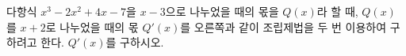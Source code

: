 \noindent\begin{minipage}[t]{0.58\linewidth}\vspace{0pt}\raggedright 다항식 $x^3-2x^2+4x-7$을 $x-3$으로 나누었을 때의 몫을 $Q(x)$라 할 때, $Q(x)$를 $x+2$로 나누었을 때의 몫 $Q'(x)$를 오른쪽과 같이 조립제법을 두 번 이용하여 구하려고 한다. $Q'(x)$를 구하시오.\end{minipage}\hfill\begin{minipage}[t]{0.4\linewidth}\vspace{0pt}\centering \resizebox{\ifdim\width>\linewidth\linewidth\else\width\fi}{!}{}\end{minipage}\par
